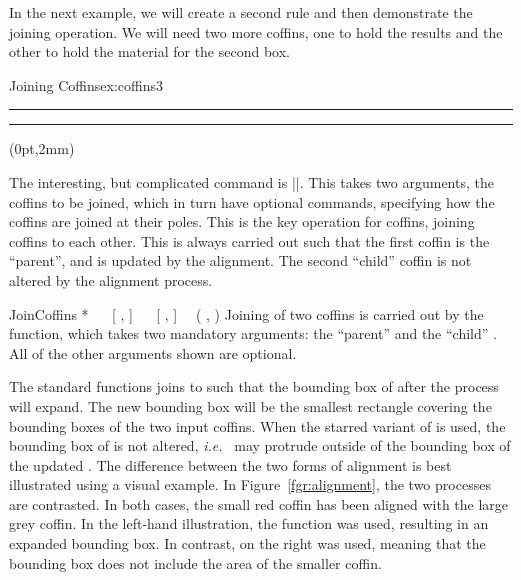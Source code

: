 In the next example, we will create a second rule and then demonstrate the joining operation. We will need two more coffins, one to hold the results and the other to hold the material for the second box.

\begin{texexample}{Joining Coffins}{ex:coffins3}
\NewCoffin\ExampleCoffinTwo
\NewCoffin\Result
\SetHorizontalCoffin\ExampleCoffin
   {\color{red}\rule{3cm}{1pc}} 
\SetHorizontalCoffin\ExampleCoffinTwo
   {\color{green}\rule{3cm}{1pc}}    
\JoinCoffins\Result\ExampleCoffin   
\JoinCoffins {} \ExampleCoffinTwo [b,l](0pt,2mm)
\TypesetCoffin\Result
\end{texexample}
 
The interesting, but complicated command is |\JoinCoffins|. This takes two arguments, the coffins to be joined, which in turn have optional commands, specifying how the coffins are joined at their poles. 
This is the key operation for coffins,  joining coffins to each other. This
 is always carried out such that the first coffin is the
 \enquote{parent}, and is updated by the alignment. The second
 \enquote{child} coffin is not altered by the alignment process.

 \begin{docCommand}{JoinCoffins}{  *
     ~~ [  ,  ]
     ~~ [  ,  ]
     ~~(  ,  )}
   Joining of two coffins is carried out by the 
   function, which takes two mandatory arguments: the \enquote{parent}
    and the \enquote{child} . All of the
   other arguments shown are optional.
 \end{docCommand}

   The standard  functions joins  to
    such that the bounding box of  after the
   process will expand. The new bounding box will be the smallest
   rectangle covering the bounding boxes of the two input coffins.
   When the starred variant of  is used, the bounding
   box of  is not altered, \emph{i.e.}~ may
   protrude outside of the bounding box of the updated .
   The difference between the two forms of alignment is best illustrated
   using a visual example. In Figure~\ref{fgr:alignment}, the two
   processes are contrasted. In both cases, the small red coffin has been
   aligned with the large grey coffin. In the left-hand illustration,
   the  function was used, resulting in an expanded
   bounding box. In contrast, on the right  was used,
   meaning that the bounding box does not include the area of the
   smaller coffin.
   
